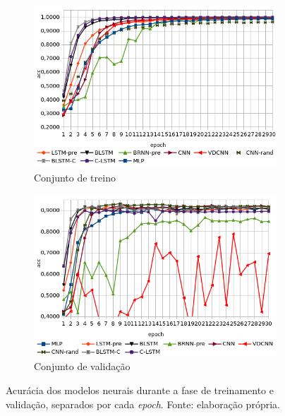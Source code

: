 \begin{figure}[ht]
    \centering
    \begin{subfigure}[b]{0.5\textwidth}
    \includegraphics[width=\textwidth]{figuras/treinoacc}
        \caption{Conjunto de treino}
        \label{fig:acc}
    \end{subfigure}\hfill
    \begin{subfigure}[b]{0.5\textwidth}
        \includegraphics[width=\textwidth]{figuras/valacc}
        \caption{Conjunto de validação}
        \label{fig:valacc}
    \end{subfigure}
    \caption[Acurácia dos modelos neurais]{Acurácia dos modelos neurais durante a fase de treinamento e validação, separados por cada \textit{epoch}. Fonte: elaboração própria.}
    \label{fig:tvacc}
\end{figure}

